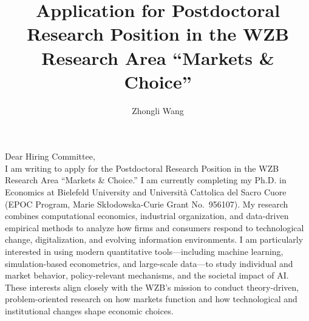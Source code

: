 \documentclass{nfr}
\title{Application for Postdoctoral Research Position in the WZB Research Area ``Markets \& Choice''}
\author{Zhongli Wang}
\begin{document}

% 
% 
% 
% 


\maketitle


\noindent Dear Hiring Committee,\\[0.2cm]

I am writing to apply for the Postdoctoral Research Position in the WZB Research Area “Markets \& Choice.” 
I am currently completing my Ph.D. in Economics at Bielefeld University and Università Cattolica del Sacro Cuore (EPOC Program, Marie Skłodowska-Curie Grant No.~956107). 
My research combines computational economics, industrial organization, and data-driven empirical methods to analyze how firms and consumers respond to technological change, digitalization, and evolving information environments. 
I am particularly interested in using modern quantitative tools—including machine learning, simulation-based econometrics, and large-scale data—to study individual and market behavior, policy-relevant mechanisms, and the societal impact of AI. 
These interests align closely with the WZB’s mission to conduct theory-driven, problem-oriented research on how markets function and how technological and institutional changes shape economic choices.\\
\end{document}
